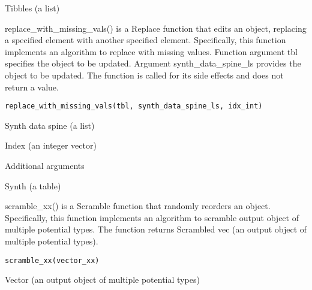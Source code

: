\documentclass[a4paper]{book}
\begin{document}
%
\begin{Value}
Tibbles (a list)
\end{Value}
%
\begin{Description}\relax
replace\_with\_missing\_vals() is a Replace function that edits an object, replacing a specified element with another specified element. Specifically, this function implements an algorithm to replace with missing values. Function argument tbl specifies the object to be updated. Argument synth\_data\_spine\_ls provides the object to be updated. The function is called for its side effects and does not return a value.
\end{Description}
%
\begin{Usage}
\begin{verbatim}
replace_with_missing_vals(tbl, synth_data_spine_ls, idx_int)
\end{verbatim}
\end{Usage}
%
\begin{Arguments}
\begin{ldescription}
\item[\code{synth\_data\_spine\_ls}] Synth data spine (a list)

\item[\code{idx\_int}] Index (an integer vector)

\item[\code{...}] Additional arguments
\end{ldescription}
\end{Arguments}
%
\begin{Value}
Synth (a table)
\end{Value}
%
\begin{Description}\relax
scramble\_xx() is a Scramble function that randomly reorders an object. Specifically, this function implements an algorithm to scramble output object of multiple potential types. The function returns Scrambled vec (an output object of multiple potential types).
\end{Description}
%
\begin{Usage}
\begin{verbatim}
scramble_xx(vector_xx)
\end{verbatim}
\end{Usage}
%
\begin{Arguments}
\begin{ldescription}
\item[\code{vector\_xx}] Vector (an output object of multiple potential types)
\end{ldescription}
\end{Arguments}
\end{document}
